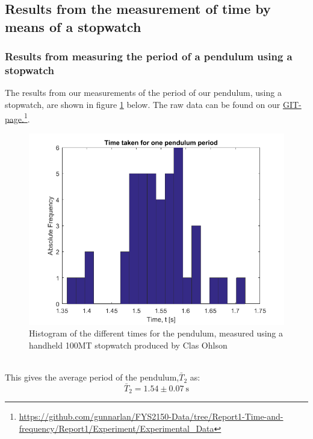 \documentclass[a4paper, 10pt]{article}
\begin{document}
\subsection{Results from the measurement of time by means of a stopwatch}
\subsubsection{Results from measuring the period of a pendulum using a stopwatch}
The results from our measurements of the period of our pendulum, using a stopwatch, are shown in figure \ref{fig:Experiment_2} below. The raw data can be found on our \href{https://github.com/gunnarlan/FYS2150-Data/tree/Report1-Time-and-frequency/Report1/Experiment/Experimental_Data}{GIT-page.}\footnote{\url{https://github.com/gunnarlan/FYS2150-Data/tree/Report1-Time-and-frequency/Report1/Experiment/Experimental_Data}}.
\begin{figure}[ht!]
\centering
\includegraphics[scale=0.7]{Experiment2.png}
\caption{Histogram of the different times for the pendulum, measured using a handheld 100MT stopwatch produced by Clas Ohlson}\label{fig:Experiment_2}
\end{figure}\\
This gives the average period of the pendulum,$\bar{T}_2$ as:
$$\bar{T}_2=1.54  \pm 0.07 \ \mathrm{s}$$
\newpage
\end{document}
